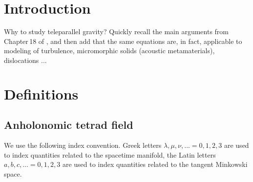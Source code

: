 \documentclass[
10pt, %
a4paper, %
oneside, %
headinclude,footinclude, %
BCOR5mm, %
]{scrartcl}
\begin{document}
\let\thefootnote\relax{}
\let\thefootnote\relax{}
\let\thefootnote\relax{}
\let\thefootnote\relax{}
\let\thefootnote\relax{}


\setlength\parindent{10pt} %
\setlength{\parskip}{5pt} %


\section{Introduction}

Why to study teleparallel gravity? Quickly recall the main arguments from Chapter\,18 of 
\cite{AldrovandiPereiraBook}, and then add that the same equations are, in fact, applicable to 
modeling of 
turbulence, micromorphic solids (acoustic metamaterials), dislocations 
\cite{PRD-Torsion2019}... 

\section{Definitions}

\subsection{Anholonomic tetrad field}

We use the following index convention. Greek letters $ \lambda,\mu,\nu,... =0,1,2,3
$ are used to index quantities related to the spacetime manifold, the Latin letters $ a,b,c,... 
=0,1,2,3$ are used to index quantities related to the tangent Minkowski space.
\end{document}
